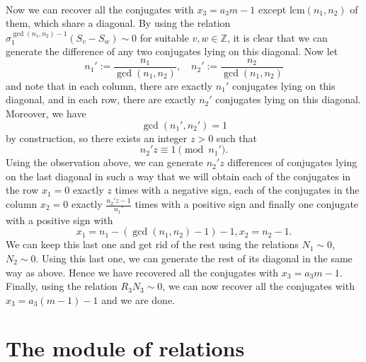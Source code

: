 \documentclass[12pt,a4paper]{article}
\newcommand{\Z}{\mathbb{Z}}
\newcommand{\lcm}{\mathrm{lcm}}
\begin{document}
\paragraph*{}
Now we can recover all the conjugates with $x_3=a_3m-1$ except $\lcm(n_1,n_2)$ of them, which share a diagonal. By using the relation $\sigma_1^{\gcd\left(n_1,n_2\right)-1}\left(S_v-S_w\right)\sim 0$ for suitable $v,w\in\Z$, it is clear that we can generate the difference of any two conjugates lying on this diagonal. Now let $$n_1':=\frac{n_1}{\gcd\left(n_1,n_2\right)}, \quad n_2':=\frac{n_2}{\gcd\left(n_1,n_2\right)}$$ and
note that in each column, there are exactly $n_1'$ conjugates lying on this diagonal, and in each row, there are exactly $n_2'$ conjugates lying on this diagonal. Moreover, we have $$\gcd\left(n_1',n_2'\right)=1$$ by construction,
so there exists an integer $z>0$ such that $$n_2'z\equiv 1\pmod{n_1'}.$$
Using the observation above, we can generate $n_2'z$ differences of conjugates lying on the last diagonal in such a way that we will obtain each of the conjugates in the row $x_1=0$ exactly $z$ times with a negative sign, each of the conjugates in the column $x_2=0$ exactly $\frac{n_2'z-1}{n_1'}$ times with a positive sign and finally one conjugate with a positive sign with $$x_1=n_1-(\gcd\left(n_1,n_2\right)-1)-1,x_2=n_2-1.$$
We can keep this last one and get rid of the rest using the relations $N_1\sim 0$, $N_2\sim 0$. Using this last one, we can generate the rest of its diagonal in the same way as above. Hence we have recovered all the conjugates with $x_3=a_3m-1$. Finally, using the relation $R_3N_3\sim 0$, we can now recover all the conjugates with $x_3=a_3(m-1)-1$ and we are done.

\section{The module of relations}
\end{document}
